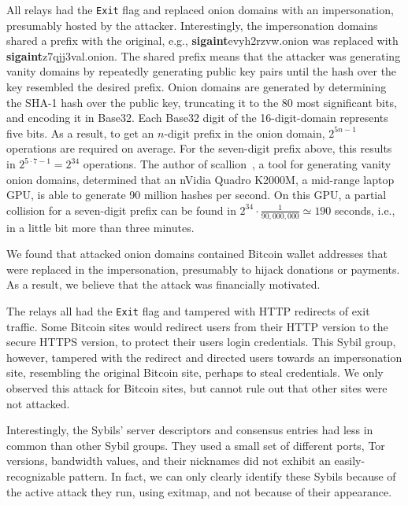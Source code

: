 All relays had the \texttt{Exit} flag and replaced onion domains with an
impersonation, presumably hosted by the attacker.  Interestingly, the
impersonation domains shared a prefix with the original, e.g.,
\textbf{sigaint}evyh2rzvw.onion was replaced with
\textbf{sigaint}z7qjj3val.onion.  The shared prefix means that the attacker was
generating vanity domains by repeatedly generating public key pairs until the
hash over the key resembled the desired prefix.  Onion domains are generated by
determining the SHA-1 hash over the public key, truncating it to the 80 most
significant bits, and encoding it in Base32.  Each Base32 digit of the
16-digit-domain represents five bits.  As a result, to get an $n$-digit prefix
in the onion domain, $2^{5 n - 1}$ operations are required on average.  For the
seven-digit prefix above, this results in $2^{5 \cdot 7 - 1} = 2^{34}$
operations.  The author of scallion~\cite{scallion}, a tool for generating
vanity onion domains, determined that an nVidia Quadro K2000M, a mid-range
laptop GPU, is able to generate 90 million hashes per second.  On this GPU, a
partial collision for a seven-digit prefix can be found in $2^{34} \cdot
\frac{1}{90,000,000} \simeq 190$ seconds, i.e., in a little bit more than three
minutes.

We found that attacked onion domains contained Bitcoin wallet addresses that
were replaced in the impersonation, presumably to hijack donations or payments.
As a result, we believe that the attack was financially motivated.

The relays all had the \texttt{Exit} flag and tampered with HTTP redirects of
exit traffic.  Some Bitcoin sites would redirect users from their HTTP version
to the secure HTTPS version, to protect their users login credentials.  This
Sybil group, however, tampered with the redirect and directed users towards an
impersonation site, resembling the original Bitcoin site, perhaps to steal
credentials.  We only observed this attack for Bitcoin sites, but cannot rule
out that other sites were not attacked.

Interestingly, the Sybils' server descriptors and consensus entries had less in
common than other Sybil groups.  They used a small set of different ports, Tor
versions, bandwidth values, and their nicknames did not exhibit an
easily-recognizable pattern.  In fact, we can only clearly identify these Sybils
because of the active attack they run, using exitmap, and not because of their
appearance.

